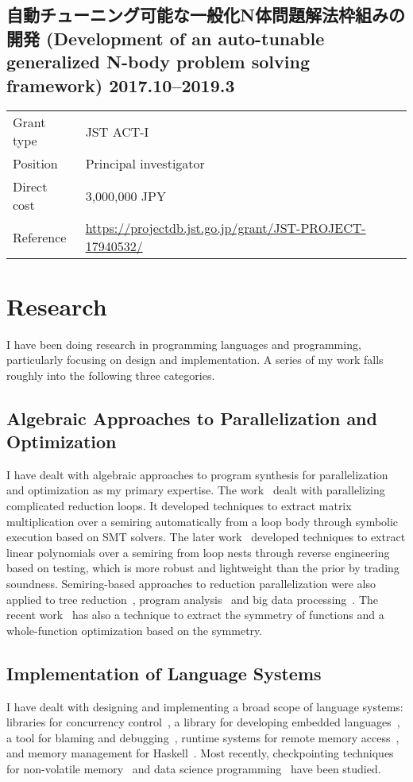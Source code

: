 \documentclass[a4paper,dvipdfmx]{article}
\newcommand{\datedsubsection}[2]{%
  \subsection[#1]{#1 \hfill #2}%
}
\begin{document}
\datedsubsection{自動チューニング可能な一般化N体問題解法枠組みの開発
(Development of an auto-tunable generalized N-body problem solving framework)}{2017.10--2019.3}
\begin{flushleft}
\begin{tabular}[t]{ll}
Grant type & JST ACT-I \\
Position  & Principal investigator \\
Direct cost & 3,000,000 JPY \\
Reference & \url{https://projectdb.jst.go.jp/grant/JST-PROJECT-17940532/} \\
\end{tabular}
\end{flushleft}

\newpage
\section{Research}
I have been doing research in programming languages and programming,
particularly focusing on design and implementation.  A series of my work
falls roughly into the following three categories.

\subsection{Algebraic Approaches to Parallelization and Optimization}
I have dealt with algebraic approaches to program synthesis for
parallelization and optimization as my primary expertise.  The
work~\cite{pldi11:red_par} dealt with parallelizing complicated
reduction loops.  It developed techniques to extract matrix
multiplication over a semiring automatically from a loop body through
symbolic execution based on SMT solvers.  The later
work~\cite{pldi21:red_par} developed techniques to extract linear
polynomials over a semiring from loop nests through reverse engineering
based on testing, which is more robust and lightweight than the prior by
trading soundness.  Semiring-based approaches to reduction
parallelization were also applied to tree
reduction~\cite{pro13:tree_par}, program analysis~\cite{aplas14:sd_dfa}
and big data processing~\cite{jip17:hadoop}.  The recent
work~\cite{splash19:nbody} has also a technique to extract the symmetry
of functions and a whole-function optimization based on the symmetry.

\subsection{Implementation of Language Systems}
I have dealt with designing and implementing a broad scope of language
systems: libraries for concurrency
control~\cite{jip22:compth,icpp15:htm}, a library for developing
embedded languages~\cite{gpce14:libdsl}, a tool for blaming and
debugging~\cite{aplas16:pyblame}, runtime systems for remote memory
access~\cite{jip22:argodsm,ispass21:ib_odp,ipdrm20:menps}, and memory
management for Haskell~\cite{compsoft15:takano}.  Most recently,
checkpointing techniques for non-volatile memory~\cite{icpp23:escort}
and data science programming~\cite{splash22:mvnb} have been studied.
\end{document}
